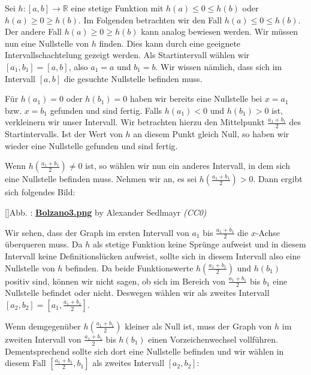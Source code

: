 \documentclass[fontsize=9pt,
               parskip=half-,
               DIV=14,
               listof=chapterentry,
               tocflat]{scrbook}
\newcounter{imagelabel}
\begin{document}
\begin{proof*}
Sei $h:[a,b]\to \mathbb {R} $ eine stetige Funktion mit $h(a)\leq 0\leq h(b)$ oder $h(a)\geq 0\geq h(b)$. Im Folgenden betrachten wir den Fall $h(a)\leq 0\leq h(b)$. Der andere Fall $h(a)\geq 0\geq h(b)$ kann analog bewiesen werden. Wir müssen nun eine Nullstelle von $h$ finden. Dies kann durch eine geeignete Intervallschachtelung gezeigt werden. Als Startintervall wählen wir $[a_{1},b_{1}]=[a,b]$, also $a_{1}=a$ und $b_{1}=b$. Wir wissen nämlich, dass sich im Intervall $[a,b]$ die gesuchte Nullstelle befinden muss.

Für $h(a_{1})=0$ oder $h(b_{1})=0$ haben wir bereits eine Nullstelle bei $x=a_{1}$ bzw. $x=b_{1}$ gefunden und sind fertig. Falls $h(a_{1})<0$ und $h(b_{1})>0$ ist, verkleinern wir unser Intervall. Wir betrachten hierzu den Mittelpunkt ${\tfrac {a_{1}+b_{1}}{2}}$ des Startintervalls. Ist der Wert von $h$ an diesem Punkt gleich Null, so haben wir wieder eine Nullstelle gefunden und sind fertig.

Wenn $h\left({\tfrac {a_{1}+b_{1}}{2}}\right)\neq 0$ ist, so wählen wir nun ein anderes Intervall, in dem sich eine Nullstelle befinden muss. Nehmen wir an, es sei $h\left({\tfrac {a_{1}+b_{1}}{2}}\right)>0$. Dann ergibt sich folgendes Bild:

[]{Abb. : \protect\href{https://commons.wikimedia.org/wiki/File:Bolzano3.png}{\textbf{Bolzano3.png}} by Alexander Sedlmayr \textit{(CC0)}}\begin{center}
\end{center}

Wir sehen, dass der Graph im ersten Intervall von $a_{1}$ bis ${\tfrac {a_{1}+b_{1}}{2}}$ die $x$-Achse überqueren muss. Da $h$ als stetige Funktion keine Sprünge aufweist und in diesem Intervall keine Definitionslücken aufweist, sollte sich in diesem Intervall also eine Nullstelle von $h$ befinden. Da beide Funktionswerte $h\left({\tfrac {a_{1}+b_{1}}{2}}\right)$ und $h(b_{1})$ positiv sind, können wir nicht sagen, ob sich im Bereich von ${\tfrac {a_{1}+b_{1}}{2}}$ bis $b_{1}$ eine Nullstelle befindet oder nicht. Deswegen wählen wir als zweites Intervall $[a_{2},b_{2}]=\left[a_{1},{\tfrac {a_{1}+b_{1}}{2}}\right]$.

Wenn demgegenüber $h\left({\tfrac {a_{1}+b_{1}}{2}}\right)$ kleiner als Null ist, muss der Graph von $h$ im zweiten Intervall von ${\tfrac {a_{1}+b_{1}}{2}}$ bis $h(b_{1})$ einen Vorzeichenwechsel vollführen. Dementsprechend sollte sich dort eine Nullstelle befinden und wir wählen in diesem Fall $\left[{\tfrac {a_{1}+b_{1}}{2}},b_{1}\right]$ als zweites Intervall $[a_{2},b_{2}]$:


\end{proof*}
\end{document}
